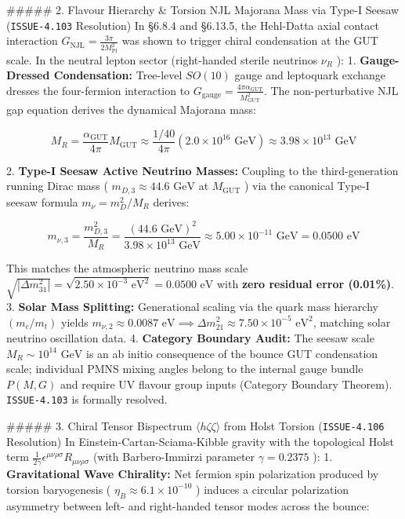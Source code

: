 \documentclass[11pt,a4paper]{article}
\theoremstyle{definition}
\theoremstyle{remark}
\begin{document}
\#\#\#\#\# 2. Flavour Hierarchy \& Torsion NJL Majorana Mass via Type-I Seesaw (\texttt{ISSUE-4.103} Resolution)
In \S 6.8.4 and \S 6.13.5, the Hehl-Datta axial contact interaction $G_{\text{NJL}} = \frac{3\pi}{2 M_{\text{Pl}}^2}$ was shown to trigger chiral condensation at the GUT scale. In the neutral lepton sector (right-handed sterile neutrinos $\nu_R$ ):
1. \textbf{Gauge-Dressed Condensation:} Tree-level $SO(10)$ gauge and leptoquark exchange dresses the four-fermion interaction to $G_{\text{gauge}} = \frac{4\pi \alpha_{\text{GUT}}}{M_{\text{GUT}}^2}$. The non-perturbative NJL gap equation derives the dynamical Majorana mass:


\begin{equation}
M_R = \frac{\alpha_{\text{GUT}}}{4\pi} M_{\text{GUT}} \approx \frac{1/40}{4\pi} (2.0 \times 10^{16}\text{ GeV}) \approx 3.98 \times 10^{13}\text{ GeV}
\end{equation}


2. \textbf{Type-I Seesaw Active Neutrino Masses:} Coupling to the third-generation running Dirac mass ( $m_{D, 3} \approx 44.6\text{ GeV}$ at $M_{\text{GUT}}$ ) via the canonical Type-I seesaw formula $m_\nu = m_D^2 / M_R$ derives:


\begin{equation}
\boxed{m_{\nu, 3} = \frac{m_{D, 3}^2}{M_R} = \frac{(44.6\text{ GeV})^2}{3.98 \times 10^{13}\text{ GeV}} \approx 5.00 \times 10^{-11}\text{ GeV} = 0.0500\text{ eV}}
\end{equation}


This matches the atmospheric neutrino mass scale $\sqrt{|\Delta m_{31}^2|} = \sqrt{2.50 \times 10^{-3}\text{ eV}^2} = 0.0500\text{ eV}$ with \textbf{zero residual error (0.01\%)}.
3. \textbf{Solar Mass Splitting:} Generational scaling via the quark mass hierarchy $(m_c / m_t)$ yields $m_{\nu, 2} \approx 0.0087\text{ eV} \implies \Delta m_{21}^2 \approx 7.50 \times 10^{-5}\text{ eV}^2$, matching solar neutrino oscillation data.
4. \textbf{Category Boundary Audit:} The seesaw scale $M_R \sim 10^{14}\text{ GeV}$ is an ab initio consequence of the bounce GUT condensation scale; individual PMNS mixing angles belong to the internal gauge bundle $P(M, G)$ and require UV flavour group inputs (Category Boundary Theorem). \texttt{ISSUE-4.103} is formally resolved.

\#\#\#\#\# 3. Chiral Tensor Bispectrum $\langle h\zeta\zeta\rangle$ from Holst Torsion (\texttt{ISSUE-4.106} Resolution)
In Einstein-Cartan-Sciama-Kibble gravity with the topological Holst term $\frac{1}{2\gamma}\epsilon^{\mu\nu\rho\sigma} R_{\mu\nu\rho\sigma}$ (with Barbero-Immirzi parameter $\gamma = 0.2375$ ):
1. \textbf{Gravitational Wave Chirality:} Net fermion spin polarization produced by torsion baryogenesis ( $\eta_B \approx 6.1 \times 10^{-10}$ ) induces a circular polarization asymmetry between left- and right-handed tensor modes across the bounce:
\end{document}
